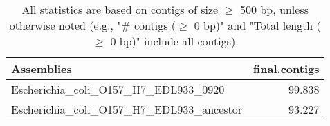 \documentclass[12pt,a4paper]{article}
\begin{document}
\begin{table}[ht]
\begin{center}
\caption{All statistics are based on contigs of size $\geq$ 500 bp, unless otherwise noted (e.g., "\# contigs ($\geq$ 0 bp)" and "Total length ($\geq$ 0 bp)" include all contigs).}
\begin{tabular}{|l*{1}{|r}|}
\hline
Assemblies & final.contigs \\ \hline
Escherichia\_coli\_O157\_H7\_EDL933\_0920 & 99.838 \\ \hline
Escherichia\_coli\_O157\_H7\_EDL933\_ancestor & 93.227 \\ \hline
\end{tabular}
\end{center}
\end{table}
\end{document}

